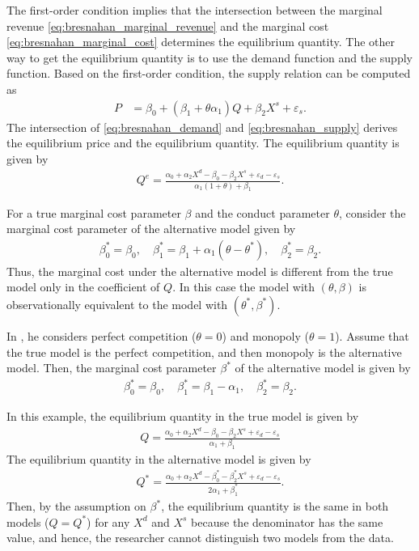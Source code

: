 \documentclass[11pt, a4paper]{article}
\theoremstyle{remark}
\begin{document}
The first-order condition implies that the intersection between the marginal revenue \eqref{eq:bresnahan_marginal_revenue} and the marginal cost \eqref{eq:bresnahan_marginal_cost} determines the equilibrium quantity.
The other way to get the equilibrium quantity is to use the demand function and the supply function.
Based on the first-order condition, the supply relation can be computed as
\begin{align}
    P & = \beta_0 + (\beta_1 + \theta\alpha_1) Q  + \beta_2 X^s + \varepsilon_s.\label{eq:bresnahan_supply}
\end{align}
The intersection of \eqref{eq:bresnahan_demand} and \eqref{eq:bresnahan_supply} derives the equilibrium price and the equilibrium quantity.
The equilibrium quantity is given by
\begin{align}
    Q^e = \frac{\alpha_0 + \alpha_2 X^d - \beta_0 - \beta_2 X^s + \varepsilon_d - \varepsilon_s}{\alpha_1(1 + \theta) +  \beta_1}.
\end{align}

For a true marginal cost parameter $\beta$ and the conduct parameter $\theta$, consider the marginal cost parameter of the alternative model given by
\begin{align}
    \beta_0^{*} = \beta_0, \quad \beta_1^{*} = \beta_1 + \alpha_1(\theta - \theta^{*}), \quad \beta_2^{*} = \beta_2.
\end{align}
Thus, the marginal cost under the alternative model is different from the true model only in the coefficient of $Q$.
In this case the model with $(\theta, \beta)$ is observationally equivalent to the model with $(\theta^{*}, \beta^{*})$.


In \citet{bresnahan1982oligopoly}, he considers perfect competition ($\theta = 0$) and monopoly ($\theta = 1$).
Assume that the true model is the perfect competition, and then monopoly is the alternative model.
Then, the marginal cost parameter $\beta^{*}$ of the alternative model is given by
\begin{align}
    \beta_0^{*} = \beta_0, \quad \beta_1^{*} = \beta_1 - \alpha_1, \quad \beta_2^{*} = \beta_2.
\end{align}

In this example, the equilibrium quantity in the true model is given by
\begin{align}
    Q = \frac{\alpha_0 + \alpha_2 X^d - \beta_0 - \beta_2 X^s + \varepsilon_d - \varepsilon_s}{\alpha_1 + \beta_1}
\end{align}
The equilibrium quantity in the alternative model is given by
\begin{align}
    Q^{*} = \frac{\alpha_0 + \alpha_2 X^d - \beta_0^{*} - \beta_2^{*} X^s + \varepsilon_d - \varepsilon_s}{2\alpha_1 + \beta_1^{*}}.
\end{align}
Then, by the assumption on $\beta^{*}$, the equilibrium quantity is the same in both models ($Q = Q^{*}$) for any $X^d$ and $X^s$ because the denominator has the same value, and hence, the researcher cannot distinguish two models from the data.
\end{document}
